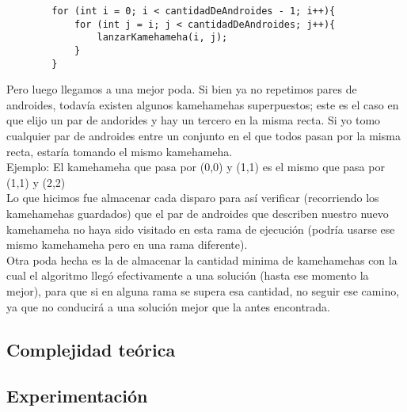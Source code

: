     \begin{codesnippet}
    \begin{verbatim}
        for (int i = 0; i < cantidadDeAndroides - 1; i++){
            for (int j = i; j < cantidadDeAndroides; j++){
                lanzarKamehameha(i, j);
            }
        }
    \end{verbatim}
    \end{codesnippet}

    Pero luego llegamos a una mejor poda. Si bien ya no repetimos pares de androides, todavía existen algunos kamehamehas superpuestos; este es el caso en que elijo un par de andorides y hay un tercero en la misma recta. Si yo tomo cualquier par de androides entre un conjunto en el que todos pasan por la misma recta, estaría tomando el mismo kamehameha. \\

    Ejemplo: El kamehameha que pasa por (0,0) y (1,1) es el mismo que pasa por (1,1) y (2,2) \\

    Lo que hicimos fue almacenar cada disparo para así verificar (recorriendo los kamehamehas guardados) que el par de androides que describen nuestro nuevo kamehameha no haya sido visitado en esta rama de ejecución (podría usarse ese mismo kamehameha pero en una rama diferente). \\

    Otra poda hecha es la de almacenar la cantidad minima de kamehamehas con la cual el algoritmo llegó efectivamente a una solución (hasta ese momento la mejor), para que si en alguna rama se supera esa cantidad, no seguir ese camino, ya que no conducirá a una solución mejor que la antes encontrada. \\  
       
    \subsection{Complejidad teórica}
         
       


    \subsection{Experimentación}
